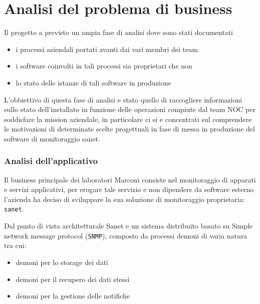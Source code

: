 \chapter{Analisi del problema di business}

Il progetto a previsto un ampia fase di analisi dove sono stati documentati

\begin{itemize}
  \item{i processi aziendali portati avanti dai vari membri dei team}
  \item{i software coinvolti in tali processi sia proprietari che non}
  \item{lo stato delle istanze di tali software in produzione}
\end{itemize}

L'obbiettivo di questa fase di analisi e stato quello di raccogliere informazioni sullo stato dell'installato in funzione delle operazioni compiute dal team NOC per soddisfare la mission aziendale, in particolare ci si e concentrati sul comprendere le motivazioni di determinate scelte progettuali in fase di messa in produzione del software di monitoraggio sanet.

\newpage
\subsection{Analisi dell'applicativo}
Il business principale dei laboratori Marconi consiste nel monitoraggio di apparati e servizi applicativi, per erogare tale servizio e non dipendere da software esterno l'azienda ha deciso di sviluppare la sua soluzione di monitoraggio proprietaria: \verb|sanet|.

Dal punto di vista architetturale Sanet e un sistema distribuito basato su Simple network message protocol (\verb|SNMP|), composto da processi demoni di varia natura tra cui:

\begin{itemize}
    \item demoni per lo storage dei dati
    \item demoni per il recupero dei dati stessi
    \item demoni per la gestione delle notifiche
\end{itemize}

